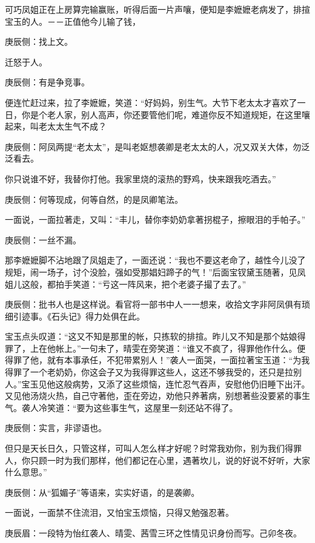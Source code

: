 \begin{parag}
    可巧凤姐正在上房算完输赢账，听得后面一片声嚷，便知是李嬷嬷老病发了，排揎宝玉的人。－－正值他今儿输了钱，\begin{note}庚辰侧：找上文。\end{note}迁怒于人。\begin{note}庚辰侧：有是争竞事。\end{note}便连忙赶过来，拉了李嬷嬷，笑道：“好妈妈，别生气。大节下老太太才喜欢了一日，你是个老人家，别人高声，你还要管他们呢，难道你反不知道规矩，在这里嚷起来，叫老太太生气不成？\begin{note}庚辰侧：阿凤两提“老太太”，是叫老妪想袭卿是老太太的人，况又双关大体，勿泛泛看去。\end{note}你只说谁不好，我替你打他。我家里烧的滚热的野鸡，快来跟我吃酒去。”\begin{note}庚辰侧：何等现成，何等自然，的是凤卿笔法。\end{note}一面说，一面拉著走，又叫：“丰儿，替你李奶奶拿著拐棍子，擦眼泪的手帕子。”\begin{note}庚辰侧：一丝不漏。\end{note}那李嬷嬷脚不沾地跟了凤姐走了，一面还说：“我也不要这老命了，越性今儿没了规矩，闹一场子，讨个没脸，强如受那娼妇蹄子的气！”后面宝钗黛玉随著，见凤姐儿这般，都拍手笑道：“亏这一阵风来，把个老婆子撮了去了。”\begin{note}庚辰侧：批书人也是这样说。看官将一部书中人一一想来，收拾文字非阿凤俱有琐细引迹事。《石头记》得力处俱在此。\end{note}
\end{parag}


\begin{parag}
    宝玉点头叹道：“这又不知是那里的帐，只拣软的排揎。昨儿又不知是那个姑娘得罪了，上在他帐上。”一句未了，晴雯在旁笑道：“谁又不疯了，得罪他作什么。便得罪了他，就有本事承任，不犯带累别人！”袭人一面哭，一面拉著宝玉道：“为我得罪了一个老奶奶，你这会子又为我得罪这些人，这还不够我受的，还只是拉别人。”宝玉见他这般病势，又添了这些烦恼，连忙忍气吞声，安慰他仍旧睡下出汗。又见他汤烧火热，自己守著他，歪在旁边，劝他只养著病，别想著些没要紧的事生气。袭人冷笑道：“要为这些事生气，这屋里一刻还站不得了。\begin{note}庚辰侧：实言，非谬语也。\end{note}但只是天长日久，只管这样，可叫人怎么样才好呢？时常我劝你，别为我们得罪人，你只顾一时为我们那样，他们都记在心里，遇著坎儿，说的好说不好听，大家什么意思。”\begin{note}庚辰侧：从“狐媚子”等语来，实实好语，的是袭卿。\end{note}一面说，一面禁不住流泪，又怕宝玉烦恼，只得又勉强忍著。\begin{note}庚辰眉：一段特为怡红袭人、晴雯、茜雪三环之性情见识身份而写。己卯冬夜。\end{note}
\end{parag}


